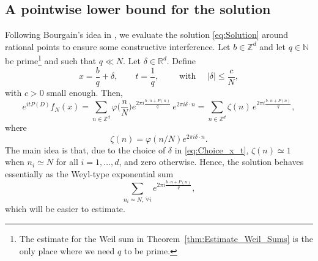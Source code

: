 \documentclass[11pt,reqno]{amsart}
\theoremstyle{definition}
\numberwithin{equation}{section}
\theoremstyle{remark}
\begin{document}
\subsection{A pointwise lower bound for the solution}
Following Bourgain's idea in \cite{Bourgain2016}, 
we evaluate the solution \eqref{eq:Solution} around rational points to ensure some constructive interference.
Let $b \in \mathbb Z^d$ and let $q \in \mathbb N$ be prime\footnote{The estimate for the Weil sum in Theorem~\ref{thm:Estimate_Weil_Sums} is the only place where we need $q$ to be prime.} 
and such that $q \ll N$. 
Let $\delta \in \mathbb R^d$. 
Define 
\begin{equation}\label{eq:Choice_x_t}
    x = \frac{b}{q} + \delta, \qquad t = \frac{1}{q}, \qquad \text{ with } \quad|\delta| \leq \frac{c}{N},
\end{equation}
with $c >0$ small enough. 
Then, 
\begin{equation}
 e^{itP(D)}f_N(x) 
 = \sum_{n \in \mathbb Z^d} \varphi\Big( \frac{n}{N} \Big) e^{2 \pi  i \frac{b \cdot n + P(n)}{q}} \, e^{2\pi i \delta \cdot n} 
 = \sum_{n \in \mathbb Z^d} \zeta(n)\,  e^{2 \pi  i \frac{b \cdot n + P(n)}{q}},
\end{equation}
where 
\begin{equation}\label{eq:Def_Zeta}
    \zeta(n) = \varphi(n/N) e^{2\pi i \delta \cdot n}.
\end{equation}
The main idea is that, 
due to the choice of $\delta$ in \eqref{eq:Choice_x_t}, $\zeta(n) \simeq 1$ when $n_i \simeq N$ for all $i=1, \ldots, d$, and zero otherwise. 
Hence, the solution behaves essentially as the Weyl-type exponential sum 
\begin{equation}
\sum_{n_i \simeq N, \,  \forall i} e^{2 \pi  i \frac{b \cdot n + P(n)}{q}}, 
\end{equation}
which will be easier to estimate. 
\end{document}
